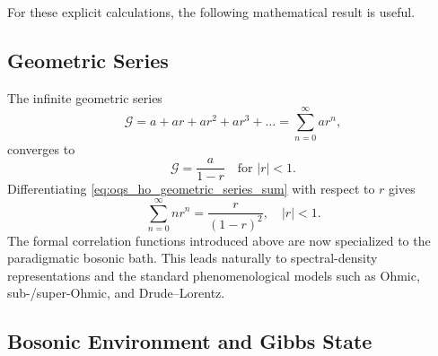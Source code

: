 For these explicit calculations, the following mathematical result is useful.


\subsection{Geometric Series}
The infinite geometric series
\begin{equation*}
	\mathcal{G} = a + ar + ar^2 + ar^3 + \dots = \sum_{n=0}^{\infty} ar^n,
\end{equation*}
converges to
\begin{equation} \label{eq:oqs_ho_geometric_series_sum}
	\mathcal{G} = \frac{a}{1-r} \quad \text{for } |r|<1.
\end{equation}
Differentiating \autoref{eq:oqs_ho_geometric_series_sum} with respect to $r$ gives
\begin{equation} \label{eq:oqs_ho_derivation_geometric_sum}
	\sum_{n=0}^{\infty} n r^n = \frac{r}{(1-r)^2}, \quad |r|<1.
\end{equation}
The formal correlation functions introduced above are now specialized to the paradigmatic bosonic bath. This leads naturally to spectral-density representations and the standard phenomenological models such as Ohmic, sub-/super-Ohmic, and Drude--Lorentz.


\subsection{Bosonic Environment and Gibbs State}
\label{subsec:oqs_bosonic_environment_gibbs}

